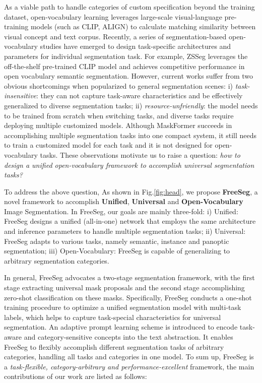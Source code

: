 \documentclass[10pt,twocolumn,letterpaper]{article}
\begin{document}
As a viable path to handle categories of custom specification beyond the training dataset, open-vocabulary learning leverages large-scale visual-language pre-training models (such as CLIP\cite{radford2021learning}, ALIGN\cite{jia2021scaling}) to calculate matching similarity between visual concept and text corpus.
Recently, a series of segmentation-based open-vocabulary studies\cite{xian2019semantic, bucher2019zero, xu2021simple} have emerged to design task-specific architectures and parameters for individual segmentation task.
For example, ZSSeg\cite{xu2021simple} leverages the off-the-shelf pre-trained CLIP model and achieves competitive performance in open vocabulary semantic segmentation. However, current works suffer from two obvious shortcomings when popularized to general segmentation scenes: 
i) \textit{task-insensitive}: they can not capture task-aware characteristics and be effectively generalized to diverse segmentation tasks;
ii)  \textit{resource-unfriendly}: the model needs to be trained from scratch when switching tasks, and diverse tasks require deploying multiple customized models.
Although MaskFormer\cite{cheng2021per} succeeds in accomplishing multiple segmentation tasks into one compact system, it still needs to train a customized model for each task and it is not designed for open-vocabulary tasks.
These observations motivate us to raise a question:  
\textit{how to design a unified open-vocabulary framework to accomplish universal segmentation tasks?}

To address the above question, As shown in Fig.\ref{fig:head}, we propose \textbf{FreeSeg}, a novel framework to accomplish \textbf{Unified}, \textbf{Universal} and \textbf{Open-Vocabulary} Image Segmentation. In FreeSeg, our goals are mainly three-fold: i)  Unified: FreeSeg designs a unified (all-in-one) network that employs the same architecture and inference parameters to handle multiple segmentation tasks; ii) Universal: FreeSeg adapts to various tasks, namely semantic, instance and panoptic segmentation; iii) Open-Vocabulary: FreeSeg is capable of generalizing to arbitrary segmentation categories.


In general, FreeSeg advocates a two-stage segmentation framework, with the first stage extracting universal mask proposals and the second stage accomplishing zero-shot classification on these masks.
Specifically, FreeSeg conducts a one-shot training procedure to optimize a unified segmentation model with multi-task labels, which helps to capture task-special characteristics for universal segmentation.
An adaptive prompt learning scheme is introduced to encode task-aware and category-sensitive concepts into the text abstraction.
It enables FreeSeg to flexibly accomplish different segmentation tasks of arbitrary categories, handling all tasks and categories in one model.
To sum up, FreeSeg is a \textit{task-flexible, category-arbitrary and performance-excellent} framework, the main contributions of our work are listed as follows:
\end{document}
